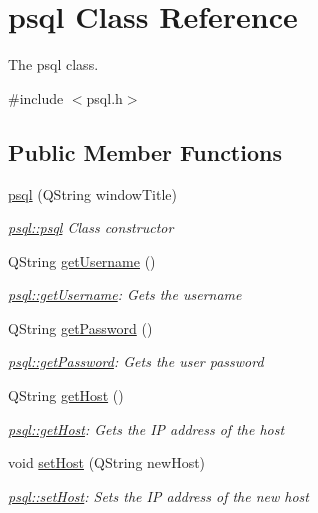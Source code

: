 \hypertarget{classpsql}{}\section{psql Class Reference}
\label{classpsql}


The psql class.  




{\ttfamily \#include $<$psql.\+h$>$}

\subsection*{Public Member Functions}
\begin{DoxyCompactItemize}
\item 
\hyperlink{classpsql_aaff5fe0931dce097850982e44e6361af}{psql} (Q\+String window\+Title)
\begin{DoxyCompactList}\small\item\em \hyperlink{classpsql_aaff5fe0931dce097850982e44e6361af}{psql\+::psql} Class constructor \end{DoxyCompactList}\item 
Q\+String \hyperlink{classpsql_aecc9fd93dc5ca0c4f4a63d445a36d166}{get\+Username} ()
\begin{DoxyCompactList}\small\item\em \hyperlink{classpsql_aecc9fd93dc5ca0c4f4a63d445a36d166}{psql\+::get\+Username}\+: Gets the username \end{DoxyCompactList}\item 
Q\+String \hyperlink{classpsql_a817e5a88f877cac6f843c1e743aec096}{get\+Password} ()
\begin{DoxyCompactList}\small\item\em \hyperlink{classpsql_a817e5a88f877cac6f843c1e743aec096}{psql\+::get\+Password}\+: Gets the user password \end{DoxyCompactList}\item 
Q\+String \hyperlink{classpsql_a95d06ee661db0b9cf72605b983b04613}{get\+Host} ()
\begin{DoxyCompactList}\small\item\em \hyperlink{classpsql_a95d06ee661db0b9cf72605b983b04613}{psql\+::get\+Host}\+: Gets the IP address of the host \end{DoxyCompactList}\item 
void \hyperlink{classpsql_a96b3b9483f1a642c026d4b5cf505eb75}{set\+Host} (Q\+String new\+Host)
\begin{DoxyCompactList}\small\item\em \hyperlink{classpsql_a96b3b9483f1a642c026d4b5cf505eb75}{psql\+::set\+Host}\+: Sets the IP address of the new host \end{DoxyCompactList}\item 

\end{DoxyCompactItemize}

